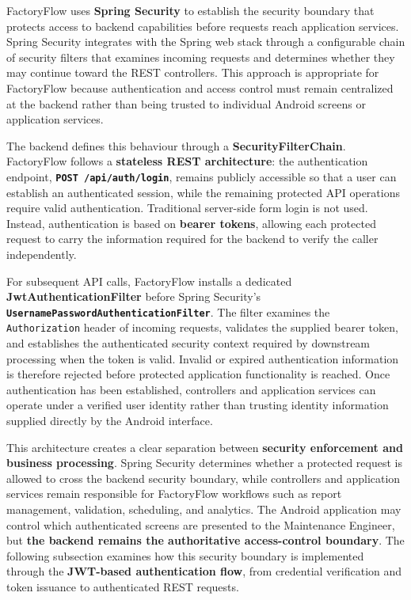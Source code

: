FactoryFlow uses \textbf{Spring Security} to establish the security boundary that protects access to backend capabilities before requests reach application services. Spring Security integrates with the Spring web stack through a configurable chain of security filters that examines incoming requests and determines whether they may continue toward the REST controllers. This approach is appropriate for FactoryFlow because authentication and access control must remain centralized at the backend rather than being trusted to individual Android screens or application services.

The backend defines this behaviour through a \textbf{SecurityFilterChain}. FactoryFlow follows a \textbf{stateless REST architecture}: the authentication endpoint, \textbf{\texttt{POST /api/auth/login}}, remains publicly accessible so that a user can establish an authenticated session, while the remaining protected API operations require valid authentication. Traditional server-side form login is not used. Instead, authentication is based on \textbf{bearer tokens}, allowing each protected request to carry the information required for the backend to verify the caller independently.

For subsequent API calls, FactoryFlow installs a dedicated \textbf{JwtAuthenticationFilter} before Spring Security's \textbf{\texttt{UsernamePasswordAuthenticationFilter}}. The filter examines the \texttt{Authorization} header of incoming requests, validates the supplied bearer token, and establishes the authenticated security context required by downstream processing when the token is valid. Invalid or expired authentication information is therefore rejected before protected application functionality is reached. Once authentication has been established, controllers and application services can operate under a verified user identity rather than trusting identity information supplied directly by the Android interface.

This architecture creates a clear separation between \textbf{security enforcement and business processing}. Spring Security determines whether a protected request is allowed to cross the backend security boundary, while controllers and application services remain responsible for FactoryFlow workflows such as report management, validation, scheduling, and analytics. The Android application may control which authenticated screens are presented to the Maintenance Engineer, but \textbf{the backend remains the authoritative access-control boundary}. The following subsection examines how this security boundary is implemented through the \textbf{JWT-based authentication flow}, from credential verification and token issuance to authenticated REST requests.


